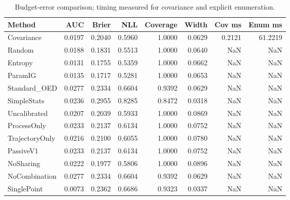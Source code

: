 \begin{table}[t]
\caption{Budget-error comparison; timing measured for covariance and explicit enumeration.}
\label{tab:experiment2}
\begin{tabular}{lrrrrrrr}
\toprule
Method & AUC & Brier & NLL & Coverage & Width & Cov ms & Enum ms \\
\midrule
Covariance & 0.0197 & 0.2040 & 0.5960 & 1.0000 & 0.0629 & 0.2121 & 61.2219 \\
Random & 0.0188 & 0.1831 & 0.5513 & 1.0000 & 0.0640 & NaN & NaN \\
Entropy & 0.0131 & 0.1755 & 0.5359 & 1.0000 & 0.0662 & NaN & NaN \\
ParamIG & 0.0135 & 0.1717 & 0.5281 & 1.0000 & 0.0653 & NaN & NaN \\
Standard\_OED & 0.0277 & 0.2334 & 0.6604 & 0.9392 & 0.0629 & NaN & NaN \\
SimpleStats & 0.0236 & 0.2955 & 0.8285 & 0.8472 & 0.0318 & NaN & NaN \\
Uncalibrated & 0.0207 & 0.2039 & 0.5933 & 1.0000 & 0.0869 & NaN & NaN \\
ProcessOnly & 0.0233 & 0.2137 & 0.6134 & 1.0000 & 0.0752 & NaN & NaN \\
TrajectoryOnly & 0.0216 & 0.2100 & 0.6055 & 1.0000 & 0.0780 & NaN & NaN \\
PassiveV1 & 0.0233 & 0.2137 & 0.6134 & 1.0000 & 0.0752 & NaN & NaN \\
NoSharing & 0.0222 & 0.1977 & 0.5806 & 1.0000 & 0.0896 & NaN & NaN \\
NoCombination & 0.0277 & 0.2334 & 0.6604 & 0.9392 & 0.0629 & NaN & NaN \\
SinglePoint & 0.0073 & 0.2362 & 0.6686 & 0.9323 & 0.0337 & NaN & NaN \\
\bottomrule
\end{tabular}
\end{table}
